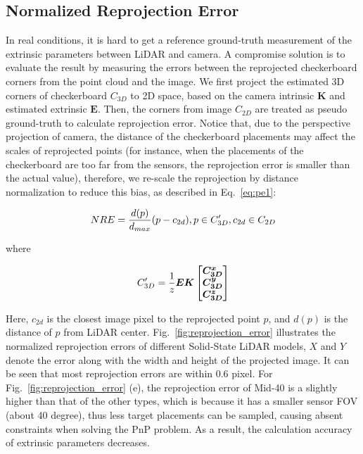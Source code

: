 \documentclass[journal]{vgtc}
\begin{document}
\subsection{Normalized Reprojection Error}

In real conditions, it is hard to get a reference ground-truth measurement of the extrinsic parameters between LiDAR and camera. A compromise solution is to evaluate the result by measuring the errors between the reprojected checkerboard corners from the point cloud and the image\cite{koide2019general}. We first project the estimated 3D corners of checkerboard $C_{3D}$ to 2D space, based on the camera intrinsic $\bm K$ and estimated extrinsic $\bm E$. Then, the corners from image $C_{2D}$ are treated as pseudo ground-truth to calculate reprojection error. Notice that, due to the perspective projection of camera, the distance of the checkerboard placements may affect the scales of reprojected points (for instance, when the placements of the checkerboard are too far from the sensors, the reprojection error is smaller than the actual value), therefore, we re-scale the reprojection by distance normalization to reduce this bias, as described in Eq.~\ref{eq:pe1}:


\begin{equation}
	\label{eq:pe1}
	\centering
	NRE=\frac{d(p)}{d_{max}}(p - c_{2d}), p \in C'_{3D}, c_{2d} \in C_{2D}
\end{equation}

where

% 
\begin{equation}
	\label{eq:pe2}
	\centering
	C'_{3D}
	= 
	\frac{1}{z} 
	\bm{E} 
	\bm{K}
	\left [
		\begin{matrix}
			\bm {C^x_{3D}} \\
			\bm {C^y_{3D}} \\
			\bm {C^z_{3D}} 
		\end{matrix}
	\right]
\end{equation}

Here, $c_{2d}$ is the closest image pixel to the reprojected point $p$, and $d(p)$ is the distance of $p$ from LiDAR center. Fig.~\ref{fig:reprojection_error} illustrates the normalized reprojection errors of different Solid-State LiDAR models, $X$ and $Y$ denote the error along with the width and height of the projected image. It can be seen that most reprojection errors are within 0.6 pixel. For Fig.~\ref{fig:reprojection_error} (e), the reprojection error of Mid-40 is a slightly higher than that of the other types, which is because it has a smaller sensor FOV (about 40 degree), thus less target placements can be sampled, causing absent constraints when solving the PnP problem. As a result, the calculation accuracy of extrinsic parameters decreases.  
\end{document}
